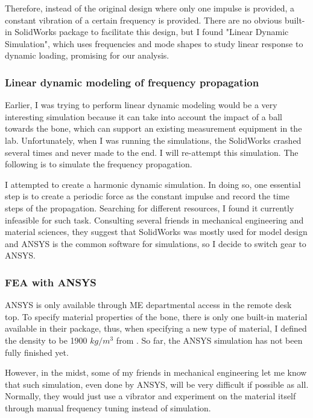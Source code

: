\documentclass{sigchi}
\begin{document}
Therefore, instead of the original design where only one impulse is provided, a constant vibration of a certain frequency is provided. There are no obvious built-in SolidWorks package to facilitate this design, but I found "Linear Dynamic Simulation", which uses frequencies and mode shapes to study linear response to dynamic loading, promising for our analysis.

\subsubsection{Linear dynamic modeling of frequency propagation} 

Earlier, I was trying to perform linear dynamic modeling would be a very interesting simulation because it can take into account the impact of a ball towards the bone, which can support an existing measurement equipment in the lab. Unfortunately, when I was running the simulations, the SolidWorks crashed several times and never made to the end. I will re-attempt this simulation. The following is to simulate the frequency propagation.

I attempted to create a harmonic dynamic simulation. In doing so, one essential step is to create a periodic force as the constant impulse and record the time steps of the propagation. Searching for different resources, I found it currently infeasible for such task. Consulting several friends in mechanical engineering and material sciences, they suggest that SolidWorks was mostly used for model design and ANSYS is the common software for simulations, so I decide to switch gear to ANSYS.

\subsubsection{FEA with ANSYS} 

ANSYS is only available through ME departmental access in the remote desk top. To specify material properties of the bone, there is only one built-in material available in their package, thus, when specifying a new type of material, I defined the density to be 1900 $kg/m^3$ from \cite{Cameron:1999:Physics}. So far, the ANSYS simulation has not been fully finished yet. 

However, in the midst, some of my friends in mechanical engineering let me know that such simulation, even done by ANSYS, will be very difficult if possible as all. Normally, they would just use a vibrator and experiment on the material itself through manual frequency tuning instead of simulation. 
\end{document}
